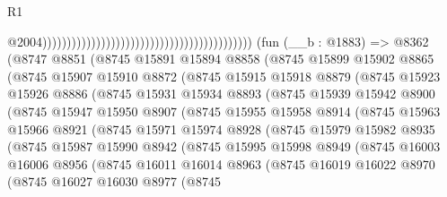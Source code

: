 \begin{lexlean}{R1}
\begin{coremodule}
                                                                                          @2004)))))))))))))))))))))))))))))))))))))))))))
    (fun (__b : @1883) =>
    @8362
      (@8747
        @8851
        (@8745
          @15891
          @15894
          @8858
          (@8745
            @15899
            @15902
            @8865
            (@8745
              @15907
              @15910
              @8872
              (@8745
                @15915
                @15918
                @8879
                (@8745
                  @15923
                  @15926
                  @8886
                  (@8745
                    @15931
                    @15934
                    @8893
                    (@8745
                      @15939
                      @15942
                      @8900
                      (@8745
                        @15947
                        @15950
                        @8907
                        (@8745
                          @15955
                          @15958
                          @8914
                          (@8745
                            @15963
                            @15966
                            @8921
                            (@8745
                              @15971
                              @15974
                              @8928
                              (@8745
                                @15979
                                @15982
                                @8935
                                (@8745
                                  @15987
                                  @15990
                                  @8942
                                  (@8745
                                    @15995
                                    @15998
                                    @8949
                                    (@8745
                                      @16003
                                      @16006
                                      @8956
                                      (@8745
                                        @16011
                                        @16014
                                        @8963
                                        (@8745
                                          @16019
                                          @16022
                                          @8970
                                          (@8745
                                            @16027
                                            @16030
                                            @8977
                                            (@8745

\end{coremodule}
\end{lexlean}
